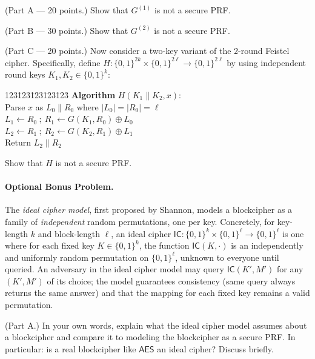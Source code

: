 \documentclass[11pt]{article}
\newcommand{\bits}{\{0,1\}}
\newcommand{\next}{ \: ; \: }
\begin{document}
\noindent (Part A --- 20 points.) Show that $G^{(1)}$ is not a secure PRF.

\medskip\noindent (Part B --- 30 points.) Show that $G^{(2)}$ is not a secure PRF.

\medskip\noindent (Part C --- 20 points.) Now consider a two-key variant of the 2-round Feistel cipher. Specifically, define $H \colon \bits^{2k} \times \bits^{2\ell} \to \bits^{2\ell}$ by using independent round keys $K_1, K_2 \in \bits^k$:

\begin{center}
\begin{minipage}{2in}
\begin{tabbing}
123\=123\=123\=123\=123\=\kill
\textbf{Algorithm} $H(K_1 \| K_2, x)$: \\
\> Parse $x$ as $L_0 \| R_0$ where $|L_0| = |R_0| = \ell$ \\
\> $L_1 \gets R_0 \next R_1 \gets G(K_1, R_0) \oplus L_0$ \\
\> $L_2 \gets R_1 \next R_2 \gets G(K_2, R_1) \oplus L_1$ \\
\> Return $L_2 \| R_2$
\end{tabbing}
\end{minipage}
\end{center}

\noindent Show that $H$ is not a secure PRF.

\paragraph*{Optional Bonus Problem.}

The \emph{ideal cipher model}, first proposed by Shannon, models a blockcipher as a family of \emph{independent} random permutations, one per key. Concretely, for key-length $k$ and block-length $\ell$, an ideal cipher $\mathsf{IC} \colon \bits^k \times \bits^\ell \to \bits^\ell$ is one where for each fixed key $K \in \bits^k$, the function $\mathsf{IC}(K, \cdot)$ is an independently and uniformly random permutation on $\bits^\ell$, unknown to everyone until queried. An adversary in the ideal cipher model may query $\mathsf{IC}(K', M')$ for any $(K', M')$ of its choice; the model guarantees consistency (same query always returns the same answer) and that the mapping for each fixed key remains a valid permutation.

\medskip\noindent (Part A.)
In your own words, explain what the ideal cipher model assumes about a blockcipher and compare it to modeling the blockcipher as a secure PRF. In particular: is a real blockcipher like $\mathsf{AES}$ an ideal cipher? Discuss briefly.
\end{document}
